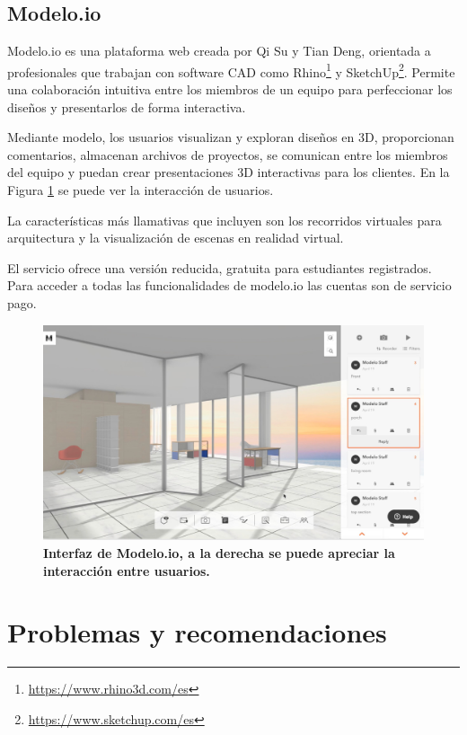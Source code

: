 \subsection{Modelo.io}

Modelo.io\citep{Modelo.io2018} es una plataforma web creada por Qi Su y Tian Deng, orientada a profesionales que trabajan con software CAD como Rhino\footnote{\url{https://www.rhino3d.com/es}} y SketchUp\footnote{\url{https://www.sketchup.com/es}}. Permite una colaboración intuitiva entre los miembros de un equipo para perfeccionar los diseños y presentarlos de forma interactiva.

Mediante modelo, los usuarios visualizan y exploran diseños en 3D, proporcionan comentarios, almacenan archivos de proyectos, se comunican entre los miembros del equipo y puedan crear presentaciones 3D interactivas para los clientes. En la Figura \ref{fig:modelo.io} se puede ver la interacción de usuarios.

La características más llamativas que incluyen son los recorridos virtuales para arquitectura y la visualización de escenas en realidad virtual.

El servicio ofrece una versión reducida, gratuita para estudiantes registrados. Para acceder a todas las funcionalidades de modelo.io las cuentas son de servicio pago.

\begin{figure}[h]
\includegraphics[width=14cm]{Img/WEB/web-modelo.jpg}
\centering
\caption{\textbf{ \footnotesize{Interfaz de Modelo.io, a la derecha se puede apreciar la interacción entre usuarios.}}}
\label{fig:modelo.io}
\end{figure}



\section{Problemas y recomendaciones
}